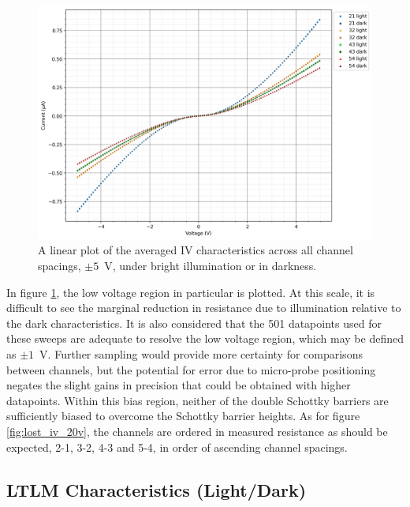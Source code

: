 \begin{refsection}
\begin{figure}[H]
    \centering
    \includegraphics[width=\linewidth]{Chapter7/Figs/Raster/Lost Data/5V Combined IV Characteristics for All Conditions.png}
    \caption{A linear plot of the averaged IV characteristics across all channel spacings, $\pm5$~\si{\volt}, under bright illumination or in darkness.}
    \label{fig:lost_iv_5v}
\end{figure}

In figure \ref{fig:lost_iv_5v}, the low voltage region in particular is plotted. At this scale, it is difficult to see the marginal reduction in resistance due to illumination relative to the dark characteristics. It is also considered that the 501 datapoints used for these sweeps are adequate to resolve the low voltage region, which may be defined as $\pm1$~\si{\volt}. Further sampling would provide more certainty for comparisons between channels, but the potential for error due to micro-probe positioning negates the slight gains in precision that could be obtained with higher datapoints. Within this bias region, neither of the double Schottky barriers are sufficiently biased to overcome the Schottky barrier heights. As for figure \ref{fig:lost_iv_20v}, the channels are ordered in measured resistance as should be expected, 2-1, 3-2, 4-3 and 5-4, in order of ascending channel spacings.

\subsection{LTLM Characteristics (Light/Dark)}


\end{refsection}
